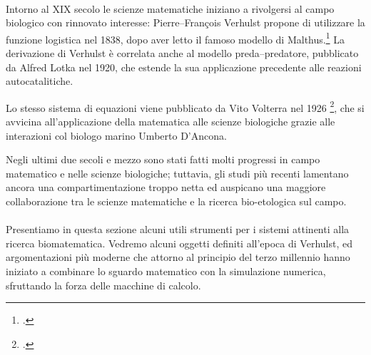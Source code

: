 \paragraph{}
Intorno al XIX secolo le scienze matematiche iniziano a rivolgersi al campo biologico con rinnovato interesse:
Pierre--François Verhulst propone di utilizzare la funzione logistica nel 1838, dopo aver letto il famoso
modello di Malthus.\footcite{malthus1986essay}
La derivazione di Verhulst è correlata anche al modello preda--predatore, pubblicato da Alfred
Lotka nel 1920, che estende la sua applicazione precedente alle reazioni autocatalitiche.

Lo stesso sistema di equazioni viene pubblicato da Vito Volterra nel 1926
\footcite{vito},
che si avvicina all'applicazione della matematica alle scienze biologiche grazie alle interazioni col
biologo marino Umberto D'Ancona.

Negli ultimi due secoli e mezzo sono stati fatti molti progressi in campo matematico e nelle scienze biologiche;
tuttavia, gli studi più recenti lamentano ancora una compartimentazione troppo netta ed auspicano una maggiore
collaborazione tra le scienze matematiche e la ricerca bio-etologica sul campo.

\paragraph{}
Presentiamo in questa sezione alcuni utili strumenti per i sistemi attinenti alla ricerca biomatematica.
Vedremo alcuni oggetti definiti all'epoca di Verhulst, ed argomentazioni più moderne che attorno al principio
del terzo millennio hanno iniziato a combinare lo sguardo matematico con la simulazione numerica,
sfruttando la forza delle macchine di calcolo.






